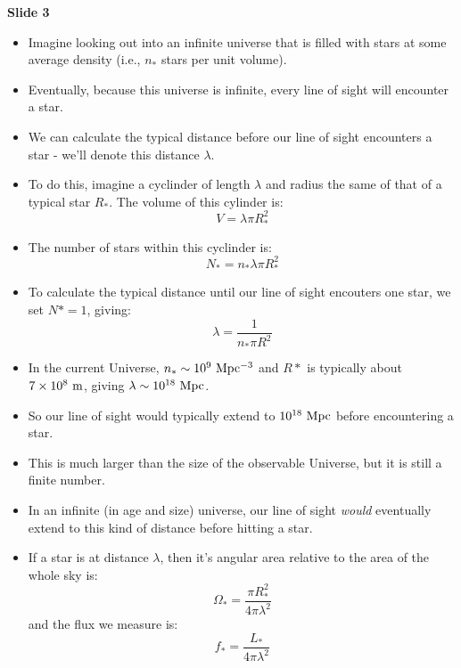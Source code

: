 \documentclass[11pt]{article}
\begin{document}
\noindent
{\bf Slide 3}
\begin{itemize}
  \item Imagine looking out into an infinite universe that is filled with stars at some average density (i.e., $n_\ast$ stars per unit volume).
  \item Eventually, because this universe is infinite, every line of sight will encounter a star.
  \item We can calculate the typical distance before our line of sight encounters a star - we'll denote this distance $\lambda$.
  \item To do this, imagine a cyclinder of length $\lambda$ and radius the same of that of a typical star $R_\ast$. The volume of this cylinder is:
  \begin{equation}
    V = \lambda\pi R_\ast^2
  \end{equation}
  \item The number of stars within this cyclinder is:
  \begin{equation}
    N_\ast = n_\ast\lambda\pi R_\ast^2
  \end{equation}
  \item To calculate the typical distance until our line of sight encouters one star, we set $N\ast=1$, giving:
  \begin{equation}
  \lambda = \frac{1}{n_\ast\pi R^2}
  \end{equation}
  \item In the current Universe, $n_\ast\sim10^9~{\rm Mpc^{-3}}$ and $R\ast$ is typically about $7\times10^8~{\rm m}$, giving $\lambda\sim10^{18}~{\rm Mpc}$.
  \item So our line of sight would typically extend to $10^{18}~{\rm Mpc}$ before encountering a star.
  \item This is much larger than the size of the observable Universe, but it is still a finite number.
  \item In an infinite (in age and size) universe, our line of sight {\it would} eventually extend to this kind of distance before hitting a star.
  \item If a star is at distance $\lambda$, then it's angular area relative to the area of the whole sky is:
  \begin{equation}
    \Omega_\ast = \frac{\pi R_\ast^2}{4\pi \lambda^2}
  \end{equation}
  and the flux we measure is:
  \begin{equation}
    f_\ast = \frac{L_\ast}{4\pi \lambda^2}
  \end{equation}

\end{itemize}
\end{document}
